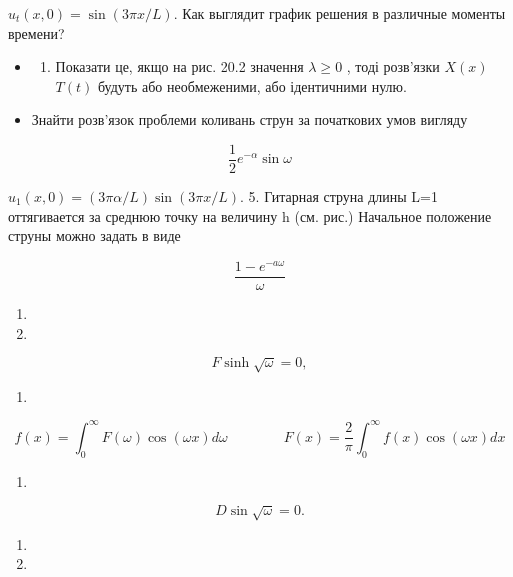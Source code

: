 \documentclass[
  ukrainian,
]{article}
\providecommand{\tightlist}{%
  \setlength{\itemsep}{0pt}\setlength{\parskip}{0pt}}
\begin{document}
\(u_t(x, 0) = \sin(3\pi x/L).\) Как выглядит график решения в различные
моменты времени?

\begin{itemize}
\tightlist
\item
  \begin{enumerate}
  \def\labelenumi{\arabic{enumi}.}
  \setcounter{enumi}{2}
  \tightlist
  \item
    Показати це, якщо на рис. 20.2 значення \(\lambda \geqslant 0\) ,
    тоді розв'язки \(X(x)\) \(T(t)\) будуть або необмеженими, або
    ідентичними нулю.
  \end{enumerate}
\item
  Знайти розв'язок проблеми коливань струн за початкових умов вигляду
\end{itemize}

\[
\frac{1}{2}e^{-\alpha}\sin\omega
\]

\(u_1(x, 0) = (3\pi \alpha/L)\sin(3\pi x/L).\) 5. Гитарная струна длины
L=1 оттягивается за среднюю точку на величину h (см. рис.) Начальное
положение струны можно задать в виде

\[
\frac{1-e^{-a\omega}}{\omega}
\]

\begin{enumerate}
\def\labelenumi{\arabic{enumi}.}
\setcounter{enumi}{13}
\tightlist
\item
\item
\end{enumerate}

\[
F \sinh \sqrt{\omega} = 0,
\]

\begin{enumerate}
\def\labelenumi{\arabic{enumi}.}
\setcounter{enumi}{16}
\tightlist
\item
\end{enumerate}

\[
f(x) = \int_{0}^{\infty} F(\omega) \cos(\omega x) d\omega \qquad \qquad F(x) = \frac{2}{\pi} \int_{0}^{\infty} f(x) \cos(\omega x) dx
\]

\begin{enumerate}
\def\labelenumi{\arabic{enumi}.}
\setcounter{enumi}{18}
\tightlist
\item
\end{enumerate}

\[
D \sin \sqrt{\omega} = 0.
\]

\begin{enumerate}
\def\labelenumi{\arabic{enumi}.}
\setcounter{enumi}{18}
\tightlist
\item
\item
\end{enumerate}
\end{document}
